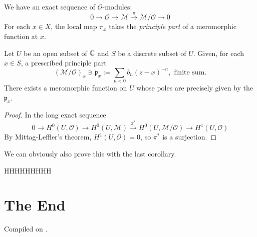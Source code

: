 \documentclass{article}
\begin{document}
We have an exact sequence of $\mathcal{O}$-modules:
\[
    0 \longrightarrow \mathcal{O} \longrightarrow \mathcal{M} \xrightarrow{\ \pi\ } \mathcal{M}/\mathcal{O} \longrightarrow 0
\]
For each $x\in X$, the local map $\pi_x$ takes the \emph{principle part} of a meromorphic function at $x$.

\begin{theorem}
    Let $U$ be an open subset of $\mathbb{C}$ and $S$ be a discrete subset of $U$. Given, for each $x\in S$, a prescribed principle part
    \[
        (\mathcal{M}/\mathcal{O})_x \ni \mathfrak{p}_x := \sum_{n<0}b_n(z-x)^{-n},\text{ finite sum}.
    \]
    There exists a meromorphic function on $U$ whose poles are precisely given by the $\mathfrak{p}_x$.
\end{theorem}

\begin{proof}
    In the long exact sequence
    \[
        0 \longrightarrow H^0(U,\mathcal{O}) \longrightarrow H^0(U,\mathcal{M}) \xrightarrow{\ \pi^*\ } H^0(U,\mathcal{M}/\mathcal{O}) \longrightarrow H^1(U,\mathcal{O})
    \]
    By Mittag-Leffler's theorem, $H^1(U,\mathcal{O})=0$, so $\pi^*$ is a surjection.
\end{proof}

\begin{remark}
    We can obviously also prove this with the last corollary.
\end{remark}

HHHHHHHHH

\section*{The End}



\noindent Compiled on \todayymd.

\noindent\home
\end{document}
